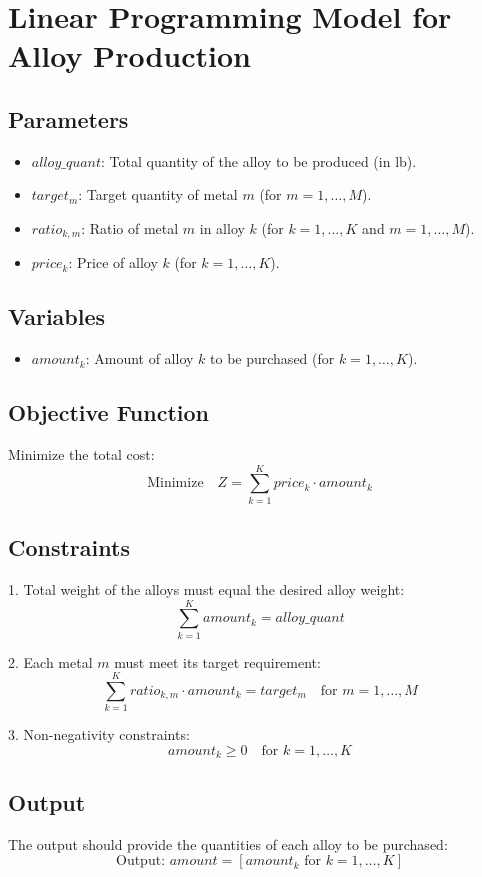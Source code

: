 \documentclass{article}
\begin{document}
\section*{Linear Programming Model for Alloy Production}

\subsection*{Parameters}
\begin{itemize}
    \item \( alloy\_quant \): Total quantity of the alloy to be produced (in lb).
    \item \( target_{m} \): Target quantity of metal \( m \) (for \( m = 1, \ldots, M \)).
    \item \( ratio_{k, m} \): Ratio of metal \( m \) in alloy \( k \) (for \( k = 1, \ldots, K \) and \( m = 1, \ldots, M \)).
    \item \( price_k \): Price of alloy \( k \) (for \( k = 1, \ldots, K \)).
\end{itemize}

\subsection*{Variables}
\begin{itemize}
    \item \( amount_k \): Amount of alloy \( k \) to be purchased (for \( k = 1, \ldots, K \)).
\end{itemize}

\subsection*{Objective Function}
Minimize the total cost:
\[
\text{Minimize} \quad Z = \sum_{k=1}^{K} price_k \cdot amount_k
\]

\subsection*{Constraints}
1. Total weight of the alloys must equal the desired alloy weight:
\[
\sum_{k=1}^{K} amount_k = alloy\_quant
\]

2. Each metal \( m \) must meet its target requirement:
\[
\sum_{k=1}^{K} ratio_{k, m} \cdot amount_k = target_{m} \quad \text{for } m = 1, \ldots, M
\]

3. Non-negativity constraints:
\[
amount_k \geq 0 \quad \text{for } k = 1, \ldots, K
\]

\subsection*{Output}
The output should provide the quantities of each alloy to be purchased:
\[
\text{Output: } amount = [amount_k \text{ for } k = 1, \ldots, K]
\]
\end{document}
